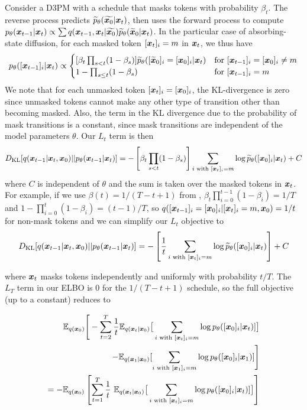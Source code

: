 Consider a D3PM with a schedule that masks tokens with probability $\beta_t$. The reverse process predicts $\widetilde{p}_\theta(\widetilde{\boldsymbol{x}_0}| \boldsymbol{x}_t)$, then uses the forward process to compute $p_{\theta}(\boldsymbol{x}_{t-1}|\boldsymbol{x}_t) \propto \sum q(\boldsymbol{x}_{t-1}, \boldsymbol{x}_t| \widetilde{\boldsymbol{x}_0}) \widetilde{p}_\theta(\widetilde{\boldsymbol{x}}_0| \boldsymbol{x}_t)$. In the particular case of absorbing-state diffusion, for each masked token $[\boldsymbol{x}_t]_i = m$ in $\boldsymbol{x}_t$, we thus have
\[
p_{\theta}([\boldsymbol{x}_{t-1}]_i|\boldsymbol{x}_t) \propto 
\begin{cases}
[\beta_t \prod_{s < t} (1-\beta_s)] \widetilde{p}_\theta([\widetilde{\boldsymbol{x}}_0]_i=[\boldsymbol{x}_{0}]_i | \boldsymbol{x}_t)
&\text{for }[\boldsymbol{x}_{t-1}]_i = [\boldsymbol{x}_{0}]_i \ne m
\\
1 - \prod_{s \le t} (1-\beta_s)
&\text{for }[\boldsymbol{x}_{t-1}]_i = m
\end{cases}
\]
We note that for each unmasked token $[\boldsymbol{x}_t]_i = [\boldsymbol{x}_0]_i$, the KL-divergence is zero since unmasked tokens cannot make any other type of transition other than becoming masked. Also, the term in the KL divergence due to the probability of mask transitions is a constant, since mask transitions are independent of the model parameters $\theta$.
Our $L_t$ term is then
$$
D_{\mathrm{KL}}[q(\boldsymbol{x}_{t-1} | \boldsymbol{x}_t, \boldsymbol{x}_0) \vert\vert p_{\theta}(\boldsymbol{x}_{t-1}|\boldsymbol{x}_t)] = -\left[\beta_t \prod_{s < t} (1-\beta_s)\right] \sum_{i \text{ with } [\boldsymbol{x}_t]_i = m} \log \widetilde{p}_\theta([\boldsymbol{x}_0]_i | \boldsymbol{x}_t) + C
$$
where $C$ is independent of $\theta$ and the sum is taken over the masked tokens in $\boldsymbol{x}_t$.
For example, if we use $\beta(t) = 1 / (T - t + 1)$ from \citet{sohl2015deep}, $\beta_t \prod_{i=0}^{t-1} (1 - \beta_i) = 1 / T$ and $1 - \prod_{i=0}^t (1 - \beta_i) = (t-1) / T$, so $q([\boldsymbol{x}_{t-1}]_i = [\boldsymbol{x}_0]_i | [\boldsymbol{x}_{t}]_i = m, \boldsymbol{x}_0) = 1 / t$ for non-mask tokens and we can simplify our $L_t$ objective to
$$D_{\mathrm{KL}}[q(\boldsymbol{x}_{t-1} | \boldsymbol{x}_t, \boldsymbol{x}_0) \vert\vert p_{\theta}(\boldsymbol{x}_{t-1}|\boldsymbol{x}_t)] = -\left[\frac{1}{t}\sum_{i \text{ with } [\boldsymbol{x}_t]_i = m} \log \widetilde{p}_\theta([\boldsymbol{x}_0]_i | \boldsymbol{x}_t)\right] + C$$

where $\boldsymbol{x}_t$ masks tokens independently and uniformly with probability $t / T$. The $L_T$ term in our ELBO is 0 for the $1 / (T - t + 1)$ schedule, so the full objective (up to a constant) reduces to

\begin{align}
    \mathbb E_{q(\boldsymbol{x}_0)}\Bigg[-\sum_{t=2}^T \frac{1}{t}\mathbb E_{q(\boldsymbol{x}_t|\boldsymbol{x}_0)} \big[
        \sum_{i \text{ with } [\boldsymbol{x}_t]_i = m} \log p_\theta([\boldsymbol{x}_0]_i | \boldsymbol{x}_t)]
        \big]
        \nonumber\\
        - \mathbb E_{q(\boldsymbol{x}_1|\boldsymbol{x}_0)} [\sum_{i \text{ with } [\boldsymbol{x}_1]_i = m} \log p_{\theta}([\boldsymbol{x}_0]_i|\boldsymbol{x}_1)]\Bigg]\nonumber\\
      =-\mathbb E_{q(\boldsymbol{x}_0)} \left[ \sum_{t=1}^T \frac{1}{t}\ \mathbb E_{q(\boldsymbol{x}_t|\boldsymbol{x}_0)} \big[
        \sum_{i \text{ with } [\boldsymbol{x}_t]_i = m} \log p_\theta([\boldsymbol{x}_0]_i | \boldsymbol{x}_t)]
        \big]\right]
    \label{eq:negative_lower_bound_aux}
\end{align}


